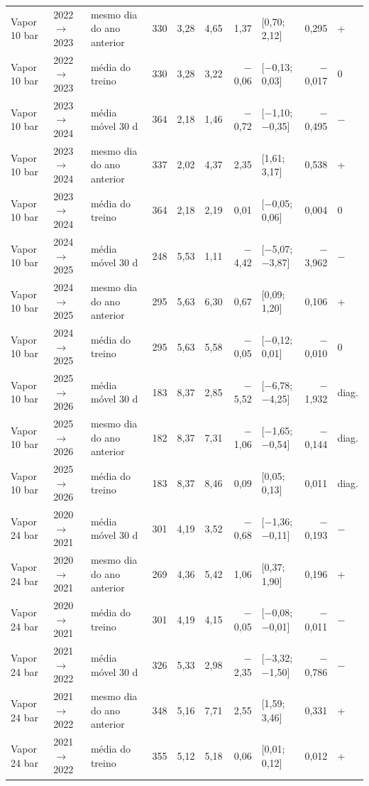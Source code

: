 {\begin{xltabular}{\linewidth}{@{}llp{2.4cm}rrrrlrl@{}}
Vapor 10 bar & 2022$\to$2023 & mesmo dia do ano anterior & 330 & 3,28 & 4,65 & 1,37 & [0,70; 2,12] & 0,295 & + \\
Vapor 10 bar & 2022$\to$2023 & média do treino & 330 & 3,28 & 3,22 & $-$0,06 & [$-$0,13; 0,03] & $-$0,017 & 0 \\
Vapor 10 bar & 2023$\to$2024 & média móvel 30 d & 364 & 2,18 & 1,46 & $-$0,72 & [$-$1,10; $-$0,35] & $-$0,495 & $-$ \\
Vapor 10 bar & 2023$\to$2024 & mesmo dia do ano anterior & 337 & 2,02 & 4,37 & 2,35 & [1,61; 3,17] & 0,538 & + \\
Vapor 10 bar & 2023$\to$2024 & média do treino & 364 & 2,18 & 2,19 & 0,01 & [$-$0,05; 0,06] & 0,004 & 0 \\
Vapor 10 bar & 2024$\to$2025 & média móvel 30 d & 248 & 5,53 & 1,11 & $-$4,42 & [$-$5,07; $-$3,87] & $-$3,962 & $-$ \\
Vapor 10 bar & 2024$\to$2025 & mesmo dia do ano anterior & 295 & 5,63 & 6,30 & 0,67 & [0,09; 1,20] & 0,106 & + \\
Vapor 10 bar & 2024$\to$2025 & média do treino & 295 & 5,63 & 5,58 & $-$0,05 & [$-$0,12; 0,01] & $-$0,010 & 0 \\
Vapor 10 bar & 2025$\to$2026 & média móvel 30 d & 183 & 8,37 & 2,85 & $-$5,52 & [$-$6,78; $-$4,25] & $-$1,932 & diag. \\
Vapor 10 bar & 2025$\to$2026 & mesmo dia do ano anterior & 182 & 8,37 & 7,31 & $-$1,06 & [$-$1,65; $-$0,54] & $-$0,144 & diag. \\
Vapor 10 bar & 2025$\to$2026 & média do treino & 183 & 8,37 & 8,46 & 0,09 & [0,05; 0,13] & 0,011 & diag. \\
Vapor 24 bar & 2020$\to$2021 & média móvel 30 d & 301 & 4,19 & 3,52 & $-$0,68 & [$-$1,36; $-$0,11] & $-$0,193 & $-$ \\
Vapor 24 bar & 2020$\to$2021 & mesmo dia do ano anterior & 269 & 4,36 & 5,42 & 1,06 & [0,37; 1,90] & 0,196 & + \\
Vapor 24 bar & 2020$\to$2021 & média do treino & 301 & 4,19 & 4,15 & $-$0,05 & [$-$0,08; $-$0,01] & $-$0,011 & $-$ \\
Vapor 24 bar & 2021$\to$2022 & média móvel 30 d & 326 & 5,33 & 2,98 & $-$2,35 & [$-$3,32; $-$1,50] & $-$0,786 & $-$ \\
Vapor 24 bar & 2021$\to$2022 & mesmo dia do ano anterior & 348 & 5,16 & 7,71 & 2,55 & [1,59; 3,46] & 0,331 & + \\
Vapor 24 bar & 2021$\to$2022 & média do treino & 355 & 5,12 & 5,18 & 0,06 & [0,01; 0,12] & 0,012 & + \\

\end{xltabular}}
